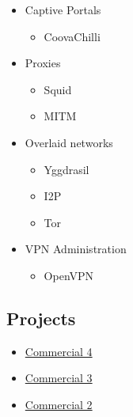 \begin{itemize}
        \item Captive Portals
        \begin{itemize}
            \item CoovaChilli
        \end{itemize}

        \item Proxies
        \begin{itemize}
            \item Squid
            \item MITM
        \end{itemize}

        \item Overlaid networks
        \begin{itemize}
            \item Yggdrasil
            \item I2P
            \item Tor
        \end{itemize}

        \item VPN Administration
        \begin{itemize}
            \item OpenVPN
        \end{itemize}
\end{itemize}

\subsection{Projects}

\begin{itemize}
    \item \hyperlink{proj_com4}{Commercial 4}
    \item \hyperlink{proj_com3}{Commercial 3}
    \item \hyperlink{proj_com2}{Commercial 2}
\end{itemize}

\newpage
